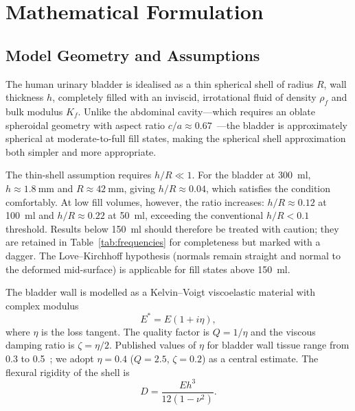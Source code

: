 \section{Mathematical Formulation}
\label{sec:theory}

\subsection{Model Geometry and Assumptions}
\label{sec:geometry}

The human urinary bladder is idealised as a thin spherical shell of radius
$R$, wall thickness $h$, completely filled with an inviscid, irrotational
fluid of density $\rho_f$ and bulk modulus $K_f$.  Unlike the abdominal
cavity---which requires an oblate spheroidal geometry with aspect ratio
$c/a \approx 0.67$~\cite{Mace2026browntone}---the bladder is approximately
spherical at moderate-to-full fill states, making the spherical shell
approximation both simpler and more appropriate.

The thin-shell assumption requires $h/R \ll 1$.  For the bladder at
\SI{300}{\milli\litre}, $h \approx \SI{1.8}{\milli\metre}$ and
$R \approx \SI{42}{\milli\metre}$, giving $h/R \approx 0.04$, which
satisfies the condition comfortably.  At low fill volumes, however, the
ratio increases: $h/R \approx 0.12$ at \SI{100}{\milli\litre} and
$h/R \approx 0.22$ at \SI{50}{\milli\litre}, exceeding the conventional
$h/R < 0.1$ threshold.  Results below \SI{150}{\milli\litre} should
therefore be treated with caution; they are retained in
Table~\ref{tab:frequencies} for completeness but marked with a dagger.
The Love--Kirchhoff hypothesis (normals remain straight and normal to
the deformed mid-surface) is applicable for fill states above
\SI{150}{\milli\litre}.

The bladder wall is modelled as a Kelvin--Voigt viscoelastic material with
complex modulus
\begin{equation}\label{eq:Estar}
  E^* = E(1 + i\eta),
\end{equation}
where $\eta$ is the loss tangent.  The quality factor is $Q = 1/\eta$ and
the viscous damping ratio is $\zeta = \eta/2$.  Published values of $\eta$
for bladder wall tissue range from 0.3 to
0.5~\cite{VanMastrigt1991,Barnes2016}; we adopt $\eta = 0.4$ ($Q = 2.5$,
$\zeta = 0.2$) as a central estimate.  The flexural rigidity of the shell is
\begin{equation}\label{eq:D}
  D = \frac{Eh^3}{12(1 - \nu^2)}.
\end{equation}


